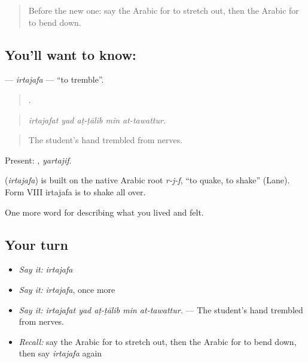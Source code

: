 \label{lesson:AR-C516-irtajafa}



\begin{quote}
Before the new one: say the Arabic for to stretch out, then the Arabic for to bend down.
\end{quote}

\subsection*{You'll want to know: }
\textbf{} — \emph{irtajafa} — \textquotedblleft{}to tremble\textquotedblright{}.

\begin{quote}
    .
\end{quote}

\begin{quote}
\emph{irtajafat yad aṭ-ṭālib min at-tawattur.}
\end{quote}

\begin{quote}
The student's hand trembled from nerves.
\end{quote}

Present: , \emph{yartajif}.

\begin{cousinweb}
\textbf{} (\emph{irtajafa}) is built on the native Arabic root \emph{r-j-f}, \textquotedblleft{}to quake, to shake\textquotedblright{} (Lane). Form VIII irtajafa is to shake all over.
\end{cousinweb}

\begin{grammarlens}[title={What you've built}]
One more word for describing what you lived and felt.
\end{grammarlens}

\subsection*{Your turn}
\begin{itemize}
\raggedright
  \item \emph{Say it:} \emph{irtajafa}
  \item \emph{Say it:} \emph{irtajafa}, once more
  \item \emph{Say it:} \emph{irtajafat yad aṭ-ṭālib min at-tawattur.} — The student's hand trembled from nerves.
  \item \emph{Recall:} say the Arabic for to stretch out, then the Arabic for to bend down, then say \emph{irtajafa} again
\end{itemize}


